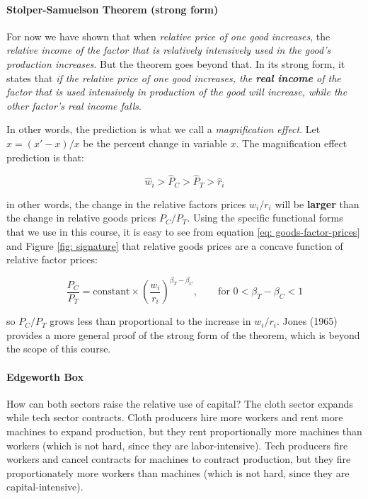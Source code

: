 \documentclass[11pt,letterpaper]{article}
\begin{document}
\paragraph{Stolper-Samuelson Theorem (strong form)} For now we have shown that when \textit{relative price of one good increases}, the \textit{relative income of the factor that is relatively intensively used in the good’s production increases}. But the theorem goes beyond that. In its strong form, it states that \textit{if the relative price of one good increases, the \textbf{real income} of the factor that is used intensively in production of the good will increase,
while the other factor’s real income falls}.

In other words, the prediction is what we call a \textit{magnification effect}. Let $\hat{x} = (x'-x)/x$ be the percent change in variable $x$. The magnification effect prediction is that:

\begin{equation*}
    \hat{w}_i > \hat{P}_C > \hat{P}_T > \hat{r}_i
\end{equation*}

\noindent in other words, the change in the relative factors prices $w_i/r_i$ will be \textbf{larger} than the change in relative goods prices $P_C/P_T$. Using the specific functional forms that we use in this course, it is easy to see from equation \eqref{eq: goods-factor-prices} and Figure \ref{fig: signature} that relative goods prices are a concave function of relative factor prices:

\begin{equation*}
    \frac{P_C}{P_T} = \text{constant} \times \left( \frac{w_i}{r_i} \right)^{\beta_T - \beta_C}, \qquad \text{for } 0<\beta_T - \beta_C<1
\end{equation*}

\noindent so $P_C/P_T$ grows less than proportional to the increase in $w_i/r_i$. Jones (1965) provides a more general proof of the strong form of the theorem, which is beyond the scope of this course.

\paragraph{Edgeworth Box} How can both sectors raise the relative use of capital? The cloth sector expands while tech sector contracts. Cloth producers hire more workers and rent more machines to expand production, but they rent proportionally more machines than workers (which is not hard, since they are labor-intensive). Tech producers fire workers and cancel contracts for machines to contract production, but they fire proportionately more workers than machines (which is not hard, since they are capital-intensive).
\end{document}
